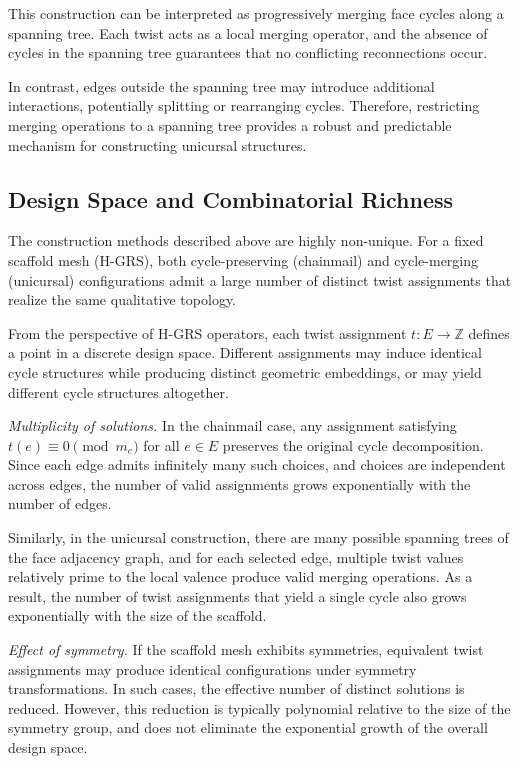 \documentclass[acmtog,anonymous,review]{acmart}
\begin{document}
This construction can be interpreted as progressively merging face
cycles along a spanning tree. Each twist acts as a local merging
operator, and the absence of cycles in the spanning tree guarantees
that no conflicting reconnections occur.

In contrast, edges outside the spanning tree may introduce additional
interactions, potentially splitting or rearranging cycles. Therefore,
restricting merging operations to a spanning tree provides a robust
and predictable mechanism for constructing unicursal structures.

\subsection{Design Space and Combinatorial Richness}

The construction methods described above are highly non-unique.
For a fixed scaffold mesh (H-GRS), both cycle-preserving (chainmail)
and cycle-merging (unicursal) configurations admit a large number of
distinct twist assignments that realize the same qualitative topology.

From the perspective of H-GRS operators, each twist assignment
$t : E \to \mathbb{Z}$ defines a point in a discrete design space.
Different assignments may induce identical cycle structures while
producing distinct geometric embeddings, or may yield different cycle
structures altogether.

\textit{Multiplicity of solutions.}
In the chainmail case, any assignment satisfying
$t(e) \equiv 0 \pmod{m_e}$ for all $e \in E$ preserves the original
cycle decomposition. Since each edge admits infinitely many such
choices, and choices are independent across edges, the number of valid
assignments grows exponentially with the number of edges.

Similarly, in the unicursal construction, there are many possible
spanning trees of the face adjacency graph, and for each selected edge,
multiple twist values relatively prime to the local valence produce
valid merging operations. As a result, the number of twist assignments
that yield a single cycle also grows exponentially with the size of
the scaffold.

\textit{Effect of symmetry.}
If the scaffold mesh exhibits symmetries, equivalent twist assignments
may produce identical configurations under symmetry transformations.
In such cases, the effective number of distinct solutions is reduced.
However, this reduction is typically polynomial relative to the size
of the symmetry group, and does not eliminate the exponential growth
of the overall design space.
\end{document}
